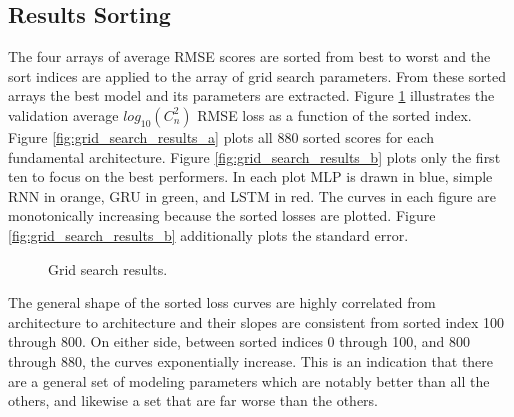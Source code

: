 \subsection{Results Sorting}
The four arrays of average RMSE scores are sorted from best to worst and the sort indices are applied to the array of grid search parameters. From these sorted arrays the best model and its parameters are extracted. Figure \ref{fig:grid_search_results} illustrates the validation average $log_{10}(C_{n}^{2})$ RMSE loss as a function of the sorted index. Figure \ref{fig:grid_search_results_a} plots all 880 sorted scores for each fundamental architecture. Figure \ref{fig:grid_search_results_b} plots only the first ten to focus on the best performers. In each plot MLP is drawn in blue, simple RNN in orange, GRU in green, and LSTM in red. The curves in each figure are monotonically increasing because the sorted losses are plotted. Figure \ref{fig:grid_search_results_b} additionally plots the standard error.
\begin{figure}[h!]
	\centering
	\hfill
	\caption{Grid search results.}
	\label{fig:grid_search_results}
\end{figure}
The general shape of the sorted loss curves are highly correlated from architecture to architecture and their slopes are consistent from sorted index 100 through 800. On either side, between sorted indices 0 through 100, and 800 through 880, the curves exponentially increase. This is an indication that there are a general set of modeling parameters which are notably better than all the others, and likewise a set that are far worse than the others.

